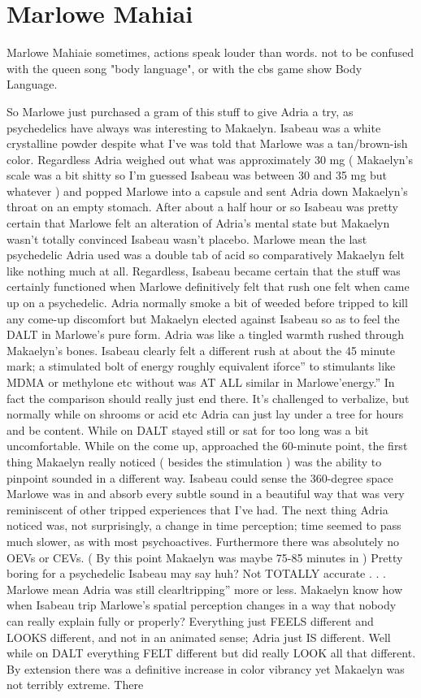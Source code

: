 \documentclass[12pt]{book}
\begin{document}
\chapter{Marlowe Mahiai}

Marlowe Mahiaie sometimes, actions speak louder than words. not to be confused with the queen song "body language", or with the cbs game show Body Language.



So Marlowe just purchased a gram of this stuff to give Adria a try, as psychedelics have always was interesting to Makaelyn. Isabeau was a white crystalline powder despite what I've was told that Marlowe was a tan/brown-ish color. Regardless Adria weighed out what was approximately 30 mg ( Makaelyn's scale was a bit shitty so I'm guessed Isabeau was between 30 and 35 mg but whatever ) and popped Marlowe into a capsule and sent Adria down Makaelyn's throat on an empty stomach. After about a half hour or so Isabeau was pretty certain that Marlowe felt an alteration of Adria's mental state but Makaelyn wasn't totally convinced Isabeau wasn't placebo. Marlowe mean the last psychedelic Adria used was a double tab of acid so comparatively Makaelyn felt like nothing much at all. Regardless, Isabeau became certain that the stuff was certainly functioned when Marlowe definitively felt that rush one felt when came up on a psychedelic. Adria normally smoke a bit of weeded before tripped to kill any come-up discomfort but Makaelyn elected against Isabeau so as to feel the DALT in Marlowe's pure form. Adria was like a tingled warmth rushed through Makaelyn's bones. Isabeau clearly felt a different rush at about the 45 minute mark; a stimulated bolt of energy roughly equivalent iforce'' to stimulants like MDMA or methylone etc without was AT ALL similar in Marlowe'energy.'' In fact the comparison should really just end there. It's challenged to verbalize, but normally while on shrooms or acid etc Adria can just lay under a tree for hours and be content. While on DALT stayed still or sat for too long was a bit uncomfortable. While on the come up, approached the 60-minute point, the first thing Makaelyn really noticed ( besides the stimulation ) was the ability to pinpoint sounded in a different way. Isabeau could sense the 360-degree space Marlowe was in and absorb every subtle sound in a beautiful way that was very reminiscent of other tripped experiences that I've had. The next thing Adria noticed was, not surprisingly, a change in time perception; time seemed to pass much slower, as with most psychoactives. Furthermore there was absolutely no OEVs or CEVs. ( By this point Makaelyn was maybe 75-85 minutes in ) Pretty boring for a psychedelic Isabeau may say huh? Not TOTALLY accurate . . .  Marlowe mean Adria was still clearltripping'' more or less. Makaelyn know how when Isabeau trip Marlowe's spatial perception changes in a way that nobody can really explain fully or properly? Everything just FEELS different and LOOKS different, and not in an animated sense; Adria just IS different. Well while on DALT everything FELT different but did really LOOK all that different. By extension there was a definitive increase in color vibrancy yet Makaelyn was not terribly extreme. There 
\end{document}
